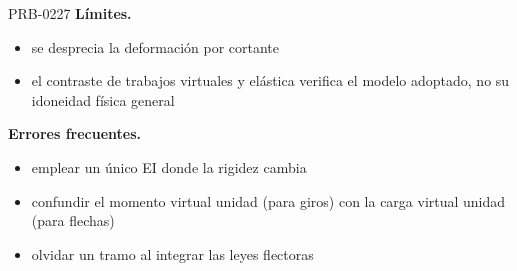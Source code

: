 \begin{studiumworked}{PRB-0227}
\textbf{Límites.}\begin{itemize}\item se desprecia la deformación por cortante
\item el contraste de trabajos virtuales y elástica verifica el modelo adoptado, no su idoneidad física general\end{itemize}

\textbf{Errores frecuentes.}\begin{itemize}\item emplear un único EI donde la rigidez cambia
\item confundir el momento virtual unidad (para giros) con la carga virtual unidad (para flechas)
\item olvidar un tramo al integrar las leyes flectoras\end{itemize}

\end{studiumworked}

\Needspace{.3\textheight}

